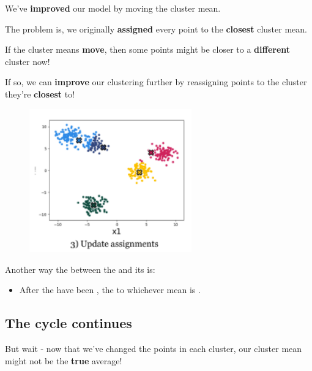         We've \textbf{improved} our model by moving the cluster mean.
        
        The problem is, we originally \textbf{assigned} every point to the \textbf{closest} cluster mean. 
        
        If the cluster means \textbf{move}, then some points might be closer to a \textbf{different} cluster now!
        
        If so, we can \textbf{improve} our clustering further by reassigning points to the cluster they're \textbf{closest} to!
        
        \begin{figure}[H]
            \centering
            \includegraphics[width=70mm,scale=0.4]{images/clustering_images/update_assignments_clustering.png}
        \end{figure}
        
        \begin{concept}
            Another way  the  between the  and its  is:
            
            \begin{itemize}
                \item After the  have been ,  the  to whichever mean is .
            \end{itemize} 
        \end{concept}
        
    \subsection{The cycle continues}
    
        But wait - now that we've changed the points in each cluster, our cluster mean might not be the \textbf{true} average!
        
